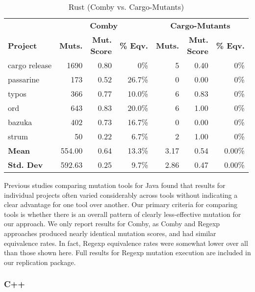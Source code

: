 \documentclass[acmsmall]{acmart}
\begin{document}
{%

\begin{table}[htbp]
\centering
\small
\caption{Rust (Comby vs. Cargo-Mutants)}
\label{tab:table_rust2}
\begin{varwidth}{.8\linewidth}
\begin{tabularx}{\columnwidth}{X|rrr|rrr}
\toprule
        & \multicolumn{3}{c|}{\textbf{Comby}}  & \multicolumn{3}{c}{\textbf{Cargo-Mutants}} \\ 
\textbf{Project} & \textbf{Muts.} & \makecell{\textbf{Mut.} \\ \textbf{Score}} & \textbf{\% Eqv.} & \textbf{Muts.} & \makecell{\textbf{Mut.} \\ \textbf{Score}} & \textbf{\% Eqv.} \\\midrule
cargo release & 1690 & 0.80 & 0\% & 5 & 0.40 & 0\%   \\
passarine & 173 & 0.52 & 26.7\% & 0 & 0.00 & 0\%   \\
typos & 366 & 0.77 & 10.0\% & 6 & 0.83 & 0\%   \\
ord & 643 & 0.83 & 20.0\% & 6 & 1.00 & 0\%   \\
bazuka & 402 & 0.73 & 16.7\% & 0 & 0.00 & 0\%   \\
strum & 50 & 0.22 & 6.7\% & 2 & 1.00 & 0\%   \\\midrule
\textbf{Mean}   & 554.00 & 0.64 & 13.3\% & 3.17 & 0.54 & 0.00\%\\
\textbf{Std. Dev} & 592.63 & 0.25 & 9.7\%   & 2.86 & 0.47 & 0.00\% \\\bottomrule
\end{tabularx}
\end{varwidth}
\end{table}

Previous studies comparing mutation tools for Java
\cite{MajorPIT,gopinath2017does,CommACMJavaTool} found that results
for individual projects often varied considerably across tools without
indicating a clear advantage for one tool over another.  Our primary
criteria for comparing tools is whether there is an overall pattern of
clearly less-effective mutation for our approach.  We only report
results for Comby, as Comby and Regexp approaches produced nearly
identical mutation scores, and had similar equivalence rates.  In
fact, Regexp equivalence rates were somewhat lower over all than those
shown here.  Full results for Regexp mutation execution are included
in our replication package.

\subsubsection{C++}

}
\end{document}
